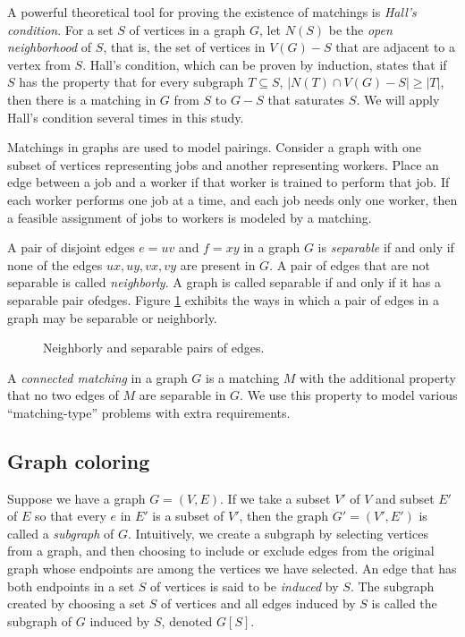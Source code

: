 A powerful theoretical tool for proving the existence of matchings is {\it Hall's condition}.  For a set $S$ of vertices in a graph $G$, let $N(S)$ be the {\it open neighborhood} of $S$, that is, the set of vertices in $V(G)-S$ that are adjacent to a vertex from $S$.  Hall's condition, which can be proven by induction, states that if $S$ has the property that for every subgraph $T \subseteq S$, $|N(T) \cap V(G)-S| \geq |T|$, then there is a matching in $G$ from $S$ to $G-S$ that saturates $S$.  We will apply Hall's condition several times in this study. 

Matchings in graphs are used to model pairings.  Consider a graph with one subset of vertices representing jobs and another representing workers.  Place an edge between a job and a worker if that worker is trained to perform that job.  If each worker performs one job at a time, and each job needs only one worker, then a feasible assignment of jobs to workers is modeled by a matching.

A pair of disjoint edges $e = uv$ and $f = xy$ in a graph $G$ is {\it separable} if and only if none of the edges $ux, uy, vx, vy$ are present in $G$.  A pair of edges that are not separable is called {\it neighborly}.  A graph is called separable if and only if it has a separable pair ofedges.  Figure \ref{separable} exhibits the ways in which a pair of edges in a graph may be separable or neighborly.  

	\begin{figure}
	\begin{center}
		\hspace{2cm}
		\hspace{2cm}
		
		\label{separable}
		\caption{Neighborly and separable pairs of edges.}
	\end{center}
	\end{figure}
A {\it connected matching} in a graph $G$ is a matching $M$ with the additional property that no two edges of $M$ are separable in $G$.  We use this property to model various ``matching-type'' problems with extra requirements.   
  
\subsection{Graph coloring}
Suppose we have a graph $G = (V, E)$.  If we take a subset $V'$ of $V$ and subset $E'$ of $E$ so that every $e$ in $E'$ is a subset of $V'$, then the graph $G' = (V',E')$ is called a {\it subgraph} of $G$.  Intuitively, we create a subgraph by selecting  vertices from a graph, and then choosing to include or exclude edges from the original graph whose endpoints are among the vertices we have selected.  An edge that has both endpoints in a set $S$ of vertices is said to be \textit{induced} by $S$.  The subgraph created by choosing a set $S$ of vertices and all edges induced by $S$ is called the subgraph of $G$ induced by $S$, denoted $G[S]$.
 

